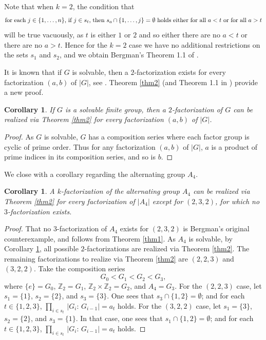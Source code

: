 \documentclass{amsart}
\newtheorem{corollary}[theorem]{Corollary}
\begin{document}
Note that when $k=2$, the condition that
%
\begin{equation*}\begin{minipage}[c]{35pc}
for each $j \in \{1, \dots, n\}$, if $j \in s_t$, then $s_a \cap \{1,\dots,j\} = \emptyset$ holds either for all $a < t$ or for all $a > t$
\end{minipage}\end{equation*}
%
 will be true vacuously, as $t$ is either $1$ or $2$ and so either there are no $a < t$ or there are no $a > t$.  Hence for the $k=2$ case we have no additional restrictions on the sets $s_1$ and $s_2$, and we obtain Bergman's Theorem 1.1 of \cite{berg2}.

It is known that if $G$ is solvable, then a $2$-factorization exists for every factorization $(a,b)$ of $|G|$, see \cite{hoosh1,bild}.  Theorem \ref{thm2} (and Theorem 1.1 in \cite{berg2}) provide a new proof.

\begin{corollary}\label{solv}
 If $G$ is a solvable finite group, then a $2$-factorization of $G$ can be realized via Theorem \ref{thm2} for every factorization $(a,b)$ of $|G|$.
\end{corollary}

\begin{proof}
As $G$ is solvable, $G$ has a composition series where each factor group is cyclic of prime order.  Thus for any factorization $(a,b)$ of $|G|$, $a$ is a product of prime indices in its composition series, and so is $b$.
\end{proof}

We close with a corollary regarding the alternating group $A_4$.

\begin{corollary}
A $k$-factorization of the alternating group $A_4$ can be realized via Theorem \ref{thm2} for every factorization of $|A_4|$ except for $(2,3,2)$, for which no $3$-factorization exists.
\end{corollary}

\begin{proof}
That no $3$-factorization of $A_4$ exists for $(2,3,2)$ is Bergman's original counterexample, and follows from Theorem \ref{thm1}.  As $A_4$ is solvable, by Corollary \ref{solv}, all possible $2$-factorizations are realized via Theorem \ref{thm2}.  The remaining factorizations to realize via Theorem \ref{thm2} are $(2,2,3)$ and $(3,2,2)$.  Take the composition series $$G_0 < G_1 < G_2 < G_3,$$ where $\{e\} = G_0$, $\mathbb{Z}_2 = G_1$, $\mathbb{Z}_2 \times \mathbb{Z}_2 = G_2$, and $A_4 = G_3$.  For the $(2,2,3)$ case, let $s_1 = \{1\}$, $s_2 = \{2\}$, and $s_3 = \{3\}$.  One sees that $s_3 \cap \{1,2\} = \emptyset$; and for each $t \in \{1,2,3\}$, $\prod_{i\in s_t}\,|G_i:\,G_{i-1}| = a_t$ holds.  For the $(3,2,2)$ case, let $s_1 = \{3\}$, $s_2 = \{2\}$, and $s_3 = \{1\}$.   In that case, one sees that $s_1 \cap \{1,2\} = \emptyset$; and for each $t \in \{1,2,3\}$, $\prod_{i\in s_t}\,|G_i:\,G_{i-1}| = a_t$ holds. 
\end{proof}
\end{document}
